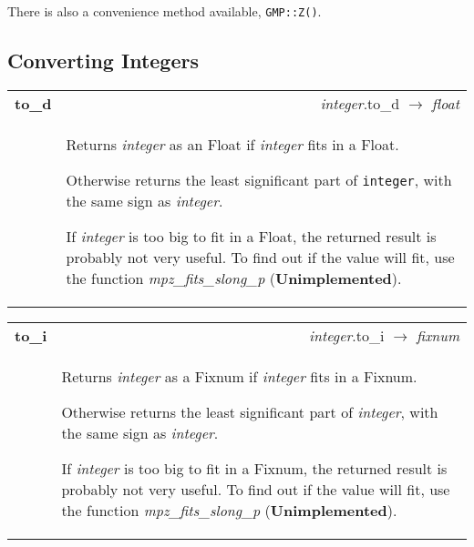 \documentclass[pdftex,10pt]{article}
\newlength{\methwidth}
\newlength{\defnwidth}
\begin{document}
There is also a convenience method available, \texttt{GMP::Z()}.\\

\subsection{Converting Integers}

\begin{tabular}{p{\methwidth} l r}
\toprule
\textbf{to\_d} & & \textit{integer}.to\_d $\rightarrow$ \textit{float} \\
\cmidrule(r){2-3}
& \multicolumn{2}{p{\defnwidth}}{
  Returns \textit{integer} as an Float if \textit{integer} fits in a Float.

  Otherwise returns the least significant part of \texttt{integer}, with the same sign as
  \textit{integer}.
  
  If \textit{integer} is too big to fit in a Float, the returned result is probably not
  very useful. To find out if the value will fit, use the function
  \textit{mpz\_fits\_slong\_p} (\textbf{Unimplemented}).
}
\end{tabular}
\newline\newline

\begin{tabular}{p{\methwidth} l r}
\toprule
\textbf{to\_i} & & \textit{integer}.to\_i $\rightarrow$ \textit{fixnum} \\
\cmidrule(r){2-3}
& \multicolumn{2}{p{\defnwidth}}{
  Returns \textit{integer} as a Fixnum if \textit{integer} fits in a Fixnum.
  \newline
  
  Otherwise returns the least significant part of \textit{integer}, with the same sign as
  \textit{integer}.
  \newline
  
  If \textit{integer} is too big to fit in a Fixnum, the returned result is probably not
  very useful. To find out if the value will fit, use the function
  \textit{mpz\_fits\_slong\_p} (\textbf{Unimplemented}).
}
\end{tabular}
\newline\newline
\end{document}
